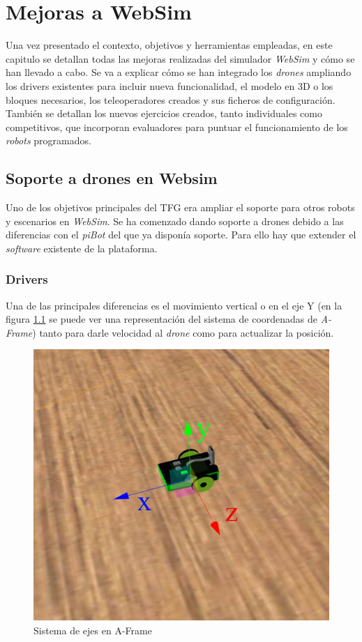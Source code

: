 \chapter{Mejoras a WebSim}
\label{chap:mejoras}
Una vez presentado el contexto, objetivos y herramientas empleadas, en este capitulo se detallan todas las mejoras realizadas del simulador \textit{WebSim} y cómo se han llevado a cabo. Se va a explicar cómo se han integrado los \textit{drones} ampliando los drivers existentes para incluir nueva funcionalidad, el modelo en 3D o los bloques necesarios, los teleoperadores creados y sus ficheros de configuración. También se detallan los nuevos ejercicios creados, tanto individuales como competitivos, que incorporan evaluadores para puntuar el funcionamiento de los \textit{robots} programados.

\section{Soporte a drones en Websim}
\label{sec:drone}

Uno de los objetivos principales del TFG era ampliar el soporte para otros robots y escenarios en \textit{WebSim}. Se ha comenzado dando soporte a drones debido a las diferencias con el \textit{piBot} del que ya disponía soporte. 
Para ello hay que extender el \textit{software} existente de la plataforma.
\subsection{Drivers}
Una de las principales diferencias es el movimiento vertical o en el eje Y (en la figura \ref{fig:ejesFrame} se puede ver una representación del sistema de coordenadas de \textit{A-Frame}) tanto para darle velocidad al \textit{drone} como para actualizar la posición. 

\begin{figure}[H]
    \centering
    \includegraphics[scale=0.3]{img/ejesframe.jpg}
    \caption{Sistema de ejes en A-Frame} \label{fig:ejesFrame}
\end{figure}


